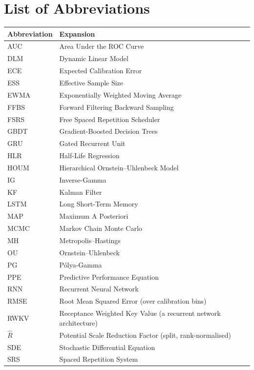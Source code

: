 \chapter*{List of Abbreviations}

\begin{tabular}{@{}p{3.2cm}p{10.3cm}@{}}
\toprule
\textbf{Abbreviation} & \textbf{Expansion}\\
\midrule
AUC & Area Under the ROC Curve\\
DLM & Dynamic Linear Model\\
ECE & Expected Calibration Error\\
ESS & Effective Sample Size\\
EWMA & Exponentially Weighted Moving Average\\
FFBS & Forward Filtering Backward Sampling\\
FSRS & Free Spaced Repetition Scheduler\\
GBDT & Gradient-Boosted Decision Trees\\
GRU & Gated Recurrent Unit\\
HLR & Half-Life Regression\\
HOUM & Hierarchical Ornstein--Uhlenbeck Model\\
IG & Inverse-Gamma\\
KF & Kalman Filter\\
LSTM & Long Short-Term Memory\\
MAP & Maximum A Posteriori\\
MCMC & Markov Chain Monte Carlo\\
MH & Metropolis--Hastings\\
OU & Ornstein--Uhlenbeck\\
PG & P\'olya-Gamma\\
PPE & Predictive Performance Equation\\
RNN & Recurrent Neural Network\\
RMSE & Root Mean Squared Error (over calibration bins)\\
RWKV & Receptance Weighted Key Value (a recurrent network architecture)\\
$\hat{R}$ & Potential Scale Reduction Factor (split, rank-normalised)\\
SDE & Stochastic Differential Equation\\
SRS & Spaced Repetition System\\
\bottomrule
\end{tabular}
